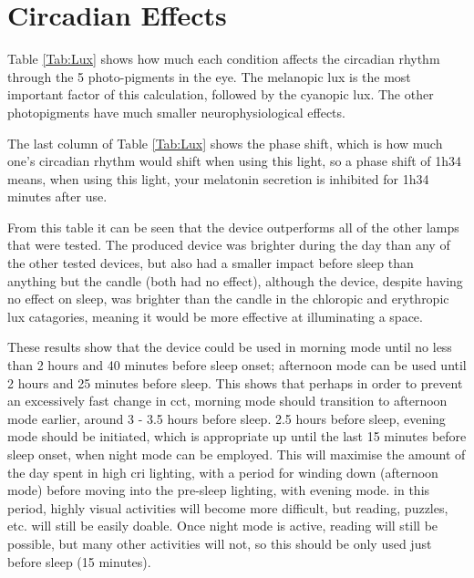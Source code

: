 \section{Circadian Effects}
\label{Sec:CircEffects}

Table \ref{Tab:Lux} shows how much each condition affects the circadian rhythm through the 5 photo-pigments in the eye. The melanopic lux is the most important factor of this calculation, followed by the cyanopic lux. The other photopigments have much smaller neurophysiological effects.

The last column of Table \ref{Tab:Lux} shows the phase shift, which is how much one's circadian rhythm would shift when using this light, so a phase shift of 1h34 means, when using this light, your melatonin secretion is inhibited for 1h34 minutes after use.

From this table it can be seen that the device outperforms all of the other lamps that were tested. The produced device was brighter during the day than any of the other tested devices, but also had a smaller impact before sleep than anything but the candle (both had no effect), although the device, despite having no effect on sleep, was brighter than the candle in the chloropic and erythropic lux catagories, meaning it would be more effective at illuminating a space.

These results show that the device could be used in \acrshort{morning} mode until no less than 2 hours and 40 minutes before sleep onset; \acrshort{afternoon} mode can be used until 2 hours and 25 minutes before sleep. This shows that perhaps in order to prevent an excessively fast change in \acrshort{cct}, \acrshort{morning} mode should transition to \acrshort{afternoon} mode earlier, around 3 - 3.5 hours before sleep. 2.5 hours before sleep, \acrshort{evening} mode should be initiated, which is appropriate up until the last 15 minutes before sleep onset, when \acrshort{night} mode can be employed. This will maximise the amount of the day spent in high \acrshort{cri} lighting, with a period for winding down (\acrshort{afternoon} mode) before moving into the pre-sleep lighting, with \acrshort{evening} mode. in this period, highly visual activities will become more difficult, but reading, puzzles, etc. will still be easily doable. Once \acrshort{night} mode is active, reading will still be possible, but many other activities will not, so this should be only used just before sleep (15 minutes).

